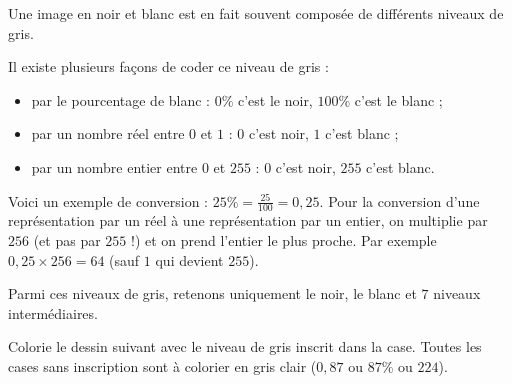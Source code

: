 \documentclass[class=report,crop=false, 12pt]{standalone}
\begin{document}
\begin{activite}

Une image en \og noir et blanc \fg{} est en fait souvent composée de différents niveaux de gris.



Il existe plusieurs façons de coder ce niveau de gris :
\begin{itemize}
  \item par le pourcentage de blanc : $0\%$ c'est le noir, $100\%$ c'est le blanc ;
  \item par un nombre réel entre $0$ et $1$ : $0$ c'est noir, $1$ c'est blanc ;
  \item par un nombre entier entre $0$ et $255$ : $0$ c'est noir, $255$ c'est blanc.
\end{itemize}

Voici un exemple de conversion : $25\% = \frac{25}{100} = 0,25$.
Pour la conversion d'une représentation par un réel à une représentation par un entier, on multiplie par $256$ (et pas par $255$ !) et on prend l'entier le plus proche. Par exemple
$0,25 \times 256 = 64$ (sauf $1$ qui devient $255$).

Parmi ces niveaux de gris, retenons uniquement le noir, le blanc et $7$ niveaux intermédiaires.

Colorie le dessin suivant avec le niveau de gris inscrit dans la case.
Toutes les cases sans inscription sont à colorier en gris clair ($0,87$ ou $87 \%$ ou $224$).


\end{activite}
\end{document}
